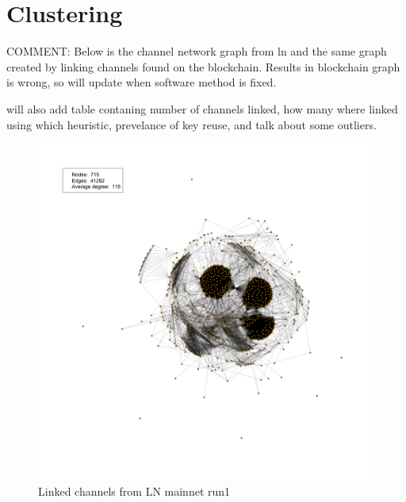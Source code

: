 \section{Clustering}

COMMENT: Below is the channel network graph from ln and the same graph created by linking channels found on the blockchain.
Results in blockchain graph is wrong, so will update when software method is fixed.

will also add table contaning number of channels linked, how many where linked using which heuristic, prevelance of key reuse, and talk about some outliers.

\begin{figure}[h]
    \centering
    \includegraphics[width=14cm]{figures/graphs/cg_ln_mainnet_run1.png}
    \caption{Linked channels from LN mainnet run1}
    \label{fig:channelGraphLNTS}
\end{figure}

